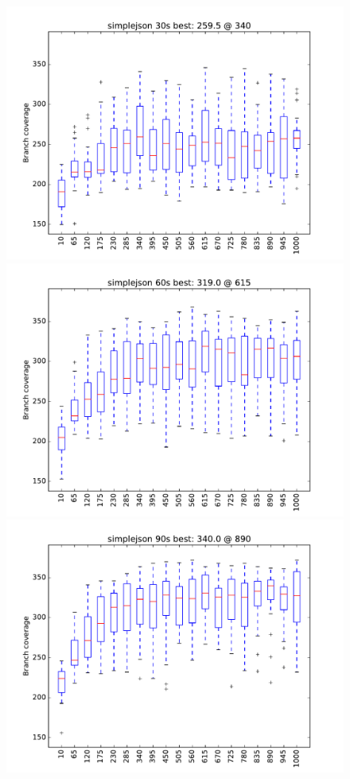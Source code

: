 \begin{figure}
\includegraphics[width=\columnwidth]{graphs/simplejsonrand30}
\includegraphics[width=\columnwidth]{graphs/simplejsonrand60}
\includegraphics[width=\columnwidth]{graphs/simplejsonrand90}
\end{figure}

